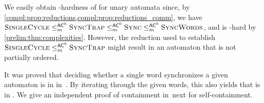 \begin{remark}
	We easily obtain \LOGSPACE-hardness of \DFASW
	for unary automata 
	since, by \cref{compl:prop:reductions,compl:prop:reductions_comm}, 
	we have $\text{\sc Single\-Cycle} \le_m^{\textup{\textsf{AC}}^0} \textsc{\sc Sync\-Trap} \le_m^{\textup{\textsf{AC}}^0} \text{\sc Sync} \le_m^{\textup{\textsf{AC}}^0} \text{\sc Sync\-Words}$,
	and \SCP is \LOGSPACE-hard
	by \cref{prelim:thm:complexities}.
	However, the reduction used
	to establish $\text{\sc Single\-Cycle} \le_m^{\textup{\textsf{AC}}^0} \textsc{\sc Sync\-Trap}$
	might result in an automaton that is not partially ordered.	
\end{remark}

It was proved that deciding whether a single word synchronizes a given automaton 
is in \LOGSPACE in~\cite[Thm.~4]{DBLP:journals/tcs/Hoffmann21}.
By iterating through the given words, this also yields that \DFASW is in \LOGSPACE.
We give an independent proof of containment in~\LOGSPACE next for self-containment.

